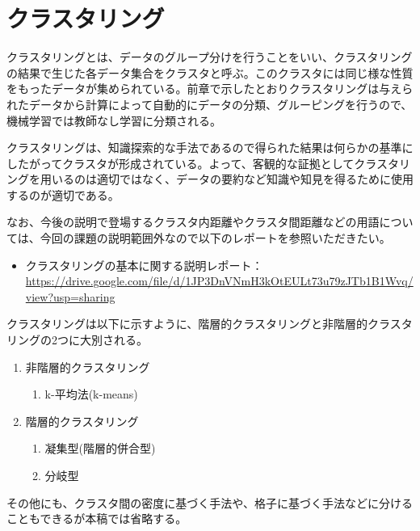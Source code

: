 \documentclass[dvipdfmx]{jsarticle}
\begin{document}
\section{クラスタリング}
クラスタリングとは、データのグループ分けを行うことをいい、クラスタリングの結果で生じた各データ集合をクラスタと呼ぶ。このクラスタには同じ様な性質をもったデータが集められている。前章で示したとおりクラスタリングは与えられたデータから計算によって自動的にデータの分類、グルーピングを行うので、機械学習では教師なし学習に分類される。\par
クラスタリングは、知識探索的な手法であるので得られた結果は何らかの基準にしたがってクラスタが形成されている。よって、客観的な証拠としてクラスタリングを用いるのは適切ではなく、データの要約など知識や知見を得るために使用するのが適切である。\par
なお、今後の説明で登場するクラスタ内距離やクラスタ間距離などの用語については、今回の課題の説明範囲外なので以下のレポートを参照いただきたい。
\begin{itemize}
  \item クラスタリングの基本に関する説明レポート：\url{https://drive.google.com/file/d/1JP3DnVNmH3kOtEULt73u79zJTb1B1Wvq/view?usp=sharing}
\end{itemize}
クラスタリングは以下に示すように、階層的クラスタリングと非階層的クラスタリングの2つに大別される。
\begin{enumerate}
  \item 非階層的クラスタリング
  \begin{enumerate}
    \item k-平均法(k-means)
  \end{enumerate}
  \item 階層的クラスタリング
  \begin{enumerate}
    \item 凝集型(階層的併合型)
    \item 分岐型
  \end{enumerate}
\end{enumerate}
その他にも、クラスタ間の密度に基づく手法や、格子に基づく手法などに分けることもできるが本稿では省略する。
\end{document}
